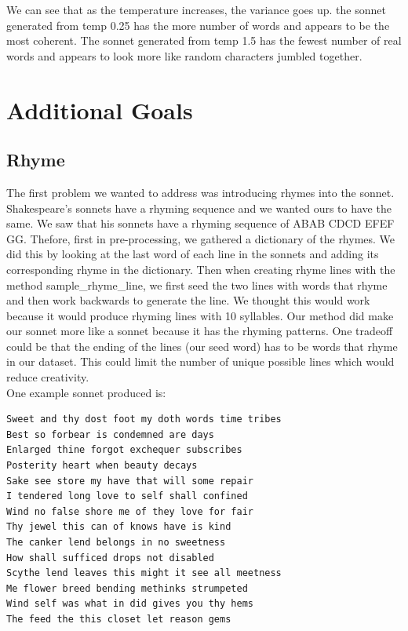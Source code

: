 We can see that as the temperature increases, the variance goes up. the sonnet generated from temp 0.25 has the more number of words and appears to be the most coherent. The sonnet generated from temp 1.5 has the fewest number of real words and appears to look more like random characters jumbled together. 

\newpage

\section{Additional Goals}
\medskip
\subsection{Rhyme}
\medskip
The first problem we wanted to address was introducing rhymes into the sonnet. Shakespeare's sonnets have a rhyming sequence and we wanted ours to have the same. We saw that his sonnets have a rhyming sequence of ABAB CDCD EFEF GG. Thefore, first in pre-processing, we gathered a dictionary of the rhymes. We did this by looking at the last word of each line in the sonnets and adding its corresponding rhyme in the dictionary. Then when creating rhyme lines with the method sample_rhyme_line, we first seed the two lines with words that rhyme and then work backwards to generate the line. We thought this would work because it would produce rhyming lines with 10 syllables. Our method did make our sonnet more like a sonnet because it has the rhyming patterns. One tradeoff could be that the ending of the lines (our seed word) has to be words that rhyme in our dataset. This could limit the number of unique possible lines which would reduce creativity. \\
One example sonnet produced is:
\begin{verbatim}
Sweet and thy dost foot my doth words time tribes
Best so forbear is condemned are days
Enlarged thine forgot exchequer subscribes
Posterity heart when beauty decays
Sake see store my have that will some repair
I tendered long love to self shall confined
Wind no false shore me of they love for fair
Thy jewel this can of knows have is kind
The canker lend belongs in no sweetness
How shall sufficed drops not disabled
Scythe lend leaves this might it see all meetness
Me flower breed bending methinks strumpeted
Wind self was what in did gives you thy hems
The feed the this closet let reason gems
\end{verbatim}

